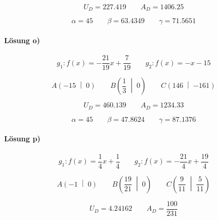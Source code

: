 \begin{equation*}
  U_D=\num{227.419}
  \qquad
  A_D=\num{1406.25}
\end{equation*}

\begin{equation*}
  \alpha=\num{45}
  \qquad
  \beta=\num{63.4349}
  \qquad
  \gamma=\num{71.5651}
\end{equation*}

\paragraph{Lösung o)}
\begin{equation*}
  g_1:f(x)=-\frac{\num{21}}{\num{19}}x+\frac{\num{7}}{\num{19}}
  \qquad
  g_2:f(x)=-x-\num{15}
\end{equation*}

\begin{equation*}
  A\left(\num{-15}\;\middle|\;\num{0}\right)
  \qquad
  B\left(\frac{\num{1}}{\num{3}}\;\middle|\;\num{0}\right)
  \qquad
  C\left(\num{146}\;\middle|\;\num{-161}\right)
\end{equation*}

\begin{equation*}
  U_D=\num{460.139}
  \qquad
  A_D=\num{1234.33}
\end{equation*}

\begin{equation*}
  \alpha=\num{45}
  \qquad
  \beta=\num{47.8624}
  \qquad
  \gamma=\num{87.1376}
\end{equation*}

\paragraph{Lösung p)}
\begin{equation*}
  g_1:f(x)=\frac{\num{1}}{\num{4}}x+\frac{\num{1}}{\num{4}}
  \qquad
  g_2:f(x)=-\frac{\num{21}}{\num{4}}x+\frac{\num{19}}{\num{4}}
\end{equation*}

\begin{equation*}
  A\left(\num{-1}\;\middle|\;\num{0}\right)
  \qquad
  B\left(\frac{\num{19}}{\num{21}}\;\middle|\;\num{0}\right)
  \qquad
  C\left(\frac{\num{9}}{\num{11}}\;\middle|\;\frac{\num{5}}{\num{11}}\right)
\end{equation*}

\begin{equation*}
  U_D=\num{4.24162}
  \qquad
  A_D=\frac{\num{100}}{\num{231}}
\end{equation*}

